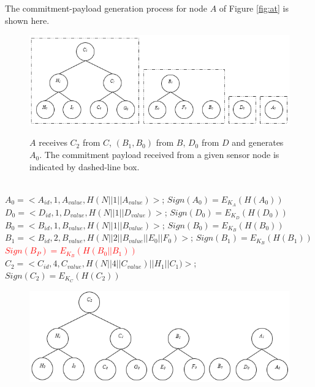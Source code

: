 			\begin{exmp} The commitment-payload generation process for node $A$ of Figure \ref{fig:at} is shown here.\\
				\begin{figure}[h!]
					\centering
					\includegraphics[scale = 1]{images/commitment-tree-example-1.png}\\
					\caption{$A$ receives $C_{2}$ from $C$, $(B_{1},B_{0})$ from $B$, $D_{0}$ from $D$ and generates $A_{0}$. The commitment payload received from a given sensor node is indicated by dashed-line box.}
					\label{fig:commitment-tree-example-1}
				\end{figure}\\
				$A_{0} = <A_{id}, 1, A_{value}, H(N||1||A_{value})>$; $Sign(A_{0}) = E_{K_{A}}(H(A_{0}))$ \\
				$D_{0} = <D_{id}, 1, D_{value}, H(N||1||D_{value})>$; $Sign(D_{0}) = E_{K_{D}}(H(D_{0}))$\\
				$B_{0} = <B_{id}, 1, B_{value}, H(N||1||B_{value})>$; $Sign(B_{0}) = E_{K_{B}}(H(B_{0}))$\\
				$B_{1} = <B_{id}, 2, B_{value}, H(N||2||B_{value}||E_{0}||F_{0})>$; $Sign(B_{1}) = E_{K_{B}}(H(B_{1}))$\\
				\textcolor{red}{$Sign(B_{P}) = E_{K_{B}}(H(B_{0} || B_{1}))$}\\
				$C_{2} = <C_{id}, 4, C_{value}, H(N||4||C_{value})||H_{1}||C_{1})>$; $Sign(C_{2}) = E_{K_{C}}(H(C_{2}))$\\
				\begin{figure}[h!]
					\centering
					\includegraphics[scale = 1]{images/commitment-tree-example-2.png}\\

\end{figure}
\end{exmp}
